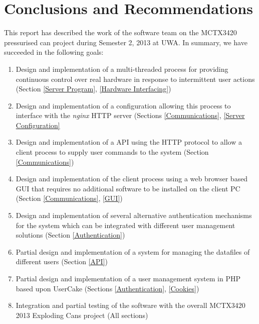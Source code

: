 \chapter{Conclusions and Recommendations}

This report has described the work of the software team on the MCTX3420 pressurised can project during Semester 2, 2013 at UWA.
In summary, we have succeeded in the following goals:

\begin{enumerate}
	\item Design and implementation of a multi-threaded process for providing continuous control over real hardware in response to intermittent user actions (Section \ref{Server Program}, \ref{Hardware Interfacing})
	\item Design and implementation of a configuration allowing this process to interface with the \emph{nginx} HTTP server (Sections \ref{Communications}, \ref{Server Configuration}
	\item Design and implementation of a API using the HTTP protocol to allow a client process to supply user commands to the system (Section \ref{Communications})
	\item Design and implementation of the client process using a web browser based GUI that requires no additional software to be installed on the client PC (Section \ref{Communications}, \ref{GUI})
	\item Design and implementation of several alternative authentication mechanisms for the system which can be integrated with different user management solutions (Section \ref{Authentication})
	\item Partial design and implementation of a system for managing the datafiles of different users (Section \ref{API})
	\item Partial design and implementation of a user management system in PHP based upon UserCake (Sections \ref{Authentication}, \ref{Cookies})
	\item Integration and partial testing of the software with the overall MCTX3420 2013 Exploding Cans project (All sections)
\end{enumerate}

